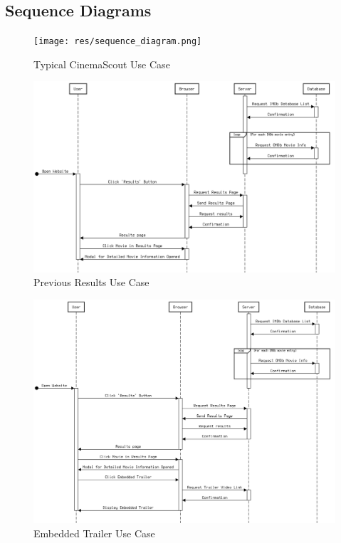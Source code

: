 \documentclass{article}
\begin{document}
\subsection{Sequence Diagrams}
\begin{figure}[H]
\texttt{[image: res/sequence\_diagram.png]}
\caption{Typical CinemaScout Use Case}
\end{figure}

\begin{figure}[H]
\includegraphics[width=\columnwidth]{res/sequence_diagram2.png}
\caption{Previous Results Use Case}
\end{figure}

\begin{figure}[H]
\includegraphics[width=\columnwidth]{res/sequence_diagram3.png}
\caption{Embedded Trailer Use Case}
\end{figure}
\end{document}
